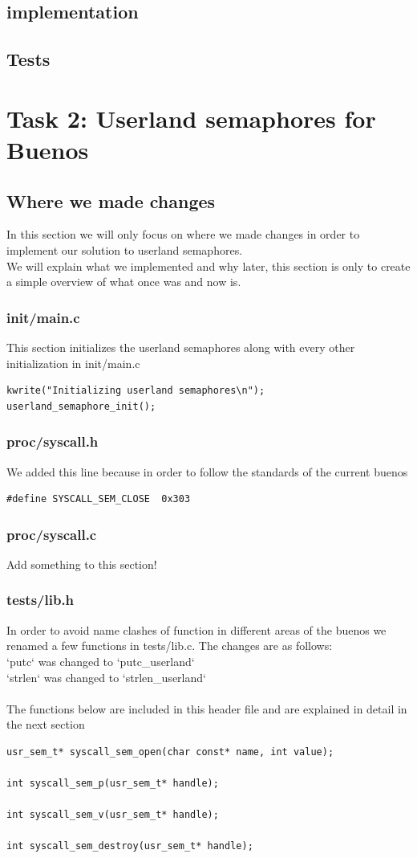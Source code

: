 \documentclass[a4paper,12pt,danish]{report}
\begin{document}
\subsection{implementation}
\subsection{Tests}
\section{Task 2: Userland semaphores for Buenos}
\subsection{Where we made changes}
In this section we will only focus on where we made changes in order to implement our solution to userland semaphores.
\\
We will explain what we implemented and why later, this section is only to create a simple overview of what once was and now is.
\subsubsection{init/main.c}
This section initializes the userland semaphores along with every other initialization in init/main.c
\begin{verbatim}
kwrite("Initializing userland semaphores\n");
userland_semaphore_init();
\end{verbatim}
\subsubsection{proc/syscall.h}
We added this line because in order to follow the standards of the current buenos
\begin{verbatim}
#define SYSCALL_SEM_CLOSE  0x303
\end{verbatim}
\subsubsection{proc/syscall.c}
Add something to this section!
\subsubsection{tests/lib.h}
In order to avoid name clashes of function in different areas of the buenos we renamed a few functions in tests/lib.c. The changes are as follows:
\\
`putc` was changed to `putc\_userland`\\
`strlen` was changed to `strlen\_userland`
\\
\\
The functions below are included in this header file and are explained in detail in the next section
\begin{verbatim}
usr_sem_t* syscall_sem_open(char const* name, int value);

int syscall_sem_p(usr_sem_t* handle);

int syscall_sem_v(usr_sem_t* handle);

int syscall_sem_destroy(usr_sem_t* handle);
\end{verbatim}
\end{document}
